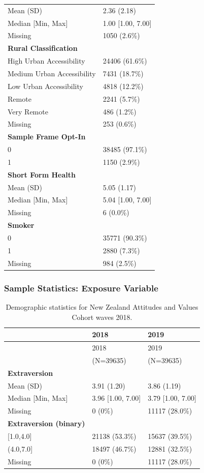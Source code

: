 \documentclass[
  single column]{article}
\begin{document}
\begin{longtable}[]{@{}ll@{}}
Mean (SD) & 2.36 (2.18) \\
Median {[}Min, Max{]} & 1.00 {[}1.00, 7.00{]} \\
Missing & 1050 (2.6\%) \\
\textbf{Rural Classification} & \\
High Urban Accessibility & 24406 (61.6\%) \\
Medium Urban Accessibility & 7431 (18.7\%) \\
Low Urban Accessibility & 4818 (12.2\%) \\
Remote & 2241 (5.7\%) \\
Very Remote & 486 (1.2\%) \\
Missing & 253 (0.6\%) \\
\textbf{Sample Frame Opt-In} & \\
0 & 38485 (97.1\%) \\
1 & 1150 (2.9\%) \\
\textbf{Short Form Health} & \\
Mean (SD) & 5.05 (1.17) \\
Median {[}Min, Max{]} & 5.04 {[}1.00, 7.00{]} \\
Missing & 6 (0.0\%) \\
\textbf{Smoker} & \\
0 & 35771 (90.3\%) \\
1 & 2880 (7.3\%) \\
Missing & 984 (2.5\%) \\
\end{longtable}

\subsubsection{Sample Statistics: Exposure
Variable}\label{appendix-exposure}

\begin{longtable}[]{@{}lll@{}}
\caption{Demographic statistics for New Zealand Attitudes and Values
Cohort waves 2018.}\label{tbl-appendix-exposures}\tabularnewline
\toprule\noalign{}
& 2018 & 2019 \\
\midrule\noalign{}
\endfirsthead
\toprule\noalign{}
& 2018 & 2019 \\
\midrule\noalign{}
\endhead
\bottomrule\noalign{}
\endlastfoot
& (N=39635) & (N=39635) \\
\textbf{Extraversion} & & \\
Mean (SD) & 3.91 (1.20) & 3.86 (1.19) \\
Median {[}Min, Max{]} & 3.96 {[}1.00, 7.00{]} & 3.79 {[}1.00, 7.00{]} \\
Missing & 0 (0\%) & 11117 (28.0\%) \\
\textbf{Extraversion (binary)} & & \\
{[}1.0,4.0{]} & 21138 (53.3\%) & 15637 (39.5\%) \\
(4.0,7.0{]} & 18497 (46.7\%) & 12881 (32.5\%) \\
Missing & 0 (0\%) & 11117 (28.0\%) \\
\end{longtable}
\end{document}
